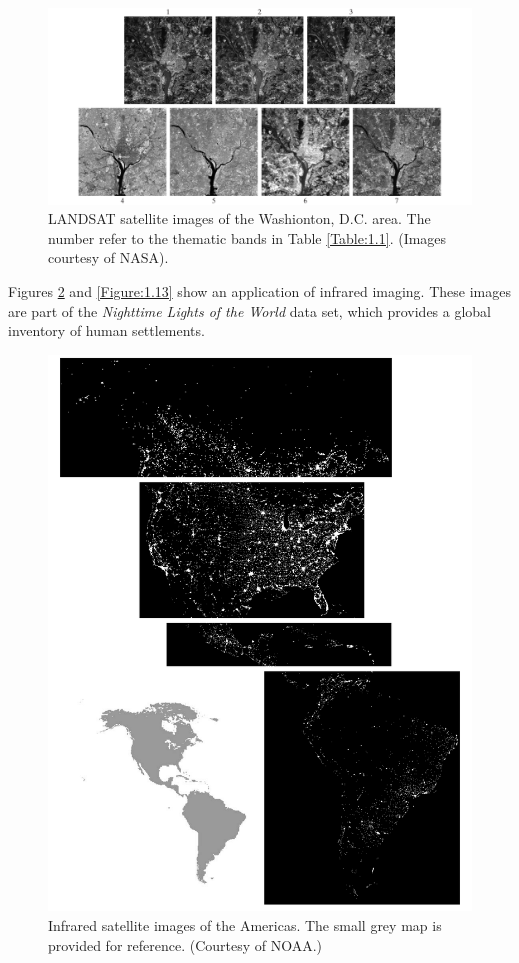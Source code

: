 \documentclass[a4paper,10pt,twoside]{book}
\begin{document}
\begin{figure}[htbp]
    \centering
    \includegraphics[width=\linewidth]{Figure1 10.png}
    \caption{LANDSAT satellite images of the Washionton, D.C. area. The number refer to the thematic bands in Table \ref{Table:1.1}. (Images courtesy of NASA).}
    \label{Figure:1.10}
\end{figure}

Figures \ref{Figure:1.12} and \ref{Figure:1.13} show an application of infrared imaging. These images are part of the \textit{Nighttime Lights of the World} data set, which provides a global inventory of human settlements.

\begin{figure}[htbp]
    \centering
    \includegraphics[width=\linewidth]{Figure1 12.jpeg}
    \caption{Infrared satellite images of the Americas. The small grey map is provided for reference. (Courtesy of NOAA.)}
    \label{Figure:1.12}
\end{figure}
\end{document}
